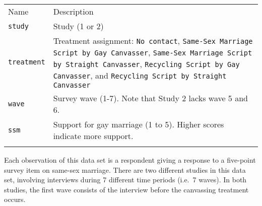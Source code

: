 \documentclass[]{article}
\begin{document}
\begin{longtable}[c]{@{}ll@{}}
\toprule\addlinespace
\begin{minipage}[b]{0.25\columnwidth}\raggedright
Name
\end{minipage} & \begin{minipage}[b]{0.68\columnwidth}\raggedright
Description
\end{minipage}
\\\addlinespace
\midrule\endhead
\begin{minipage}[t]{0.25\columnwidth}\raggedright
\texttt{study}
\end{minipage} & \begin{minipage}[t]{0.68\columnwidth}\raggedright
Study (1 or 2)
\end{minipage}
\\\addlinespace
\begin{minipage}[t]{0.25\columnwidth}\raggedright
\texttt{treatment}
\end{minipage} & \begin{minipage}[t]{0.68\columnwidth}\raggedright
Treatment assignment: \texttt{No contact},
\texttt{Same-Sex Marriage Script by Gay Canvasser},
\texttt{Same-Sex Marriage Script by Straight Canvasser},
\texttt{Recycling Script by Gay Canvasser}, and
\texttt{Recycling Script by Straight Canvasser}
\end{minipage}
\\\addlinespace
\begin{minipage}[t]{0.25\columnwidth}\raggedright
\texttt{wave}
\end{minipage} & \begin{minipage}[t]{0.68\columnwidth}\raggedright
Survey wave (1-7). Note that Study 2 lacks wave 5 and 6.
\end{minipage}
\\\addlinespace
\begin{minipage}[t]{0.25\columnwidth}\raggedright
\texttt{ssm}
\end{minipage} & \begin{minipage}[t]{0.68\columnwidth}\raggedright
Support for gay marriage (1 to 5). Higher scores indicate more support.
\end{minipage}
\\\addlinespace
\bottomrule
\end{longtable}

Each observation of this data set is a respondent giving a response to a
five-point survey item on same-sex marriage. There are two different
studies in this data set, involving interviews during 7 different time
periods (i.e.~7 waves). In both studies, the first wave consists of the
interview before the canvassing treatment occurs.
\end{document}

